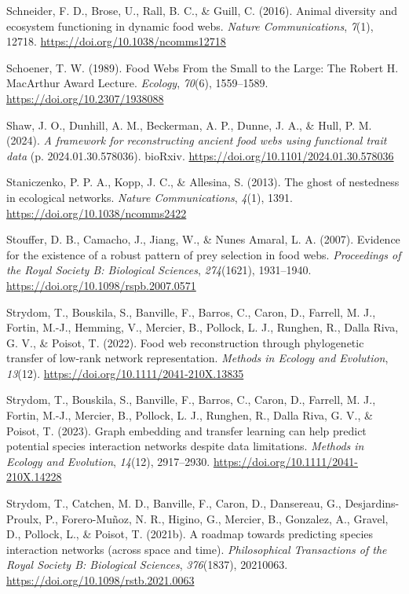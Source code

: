 \documentclass[
]{article}
\newlength{\cslhangindent}
\newenvironment{CSLReferences}[2] %
 {\begin{list}{}{%
  \setlength{\itemindent}{0pt}
  \setlength{\leftmargin}{0pt}
  \setlength{\parsep}{0pt}
  \ifodd #1
   \setlength{\leftmargin}{\cslhangindent}
   \setlength{\itemindent}{-1\cslhangindent}
  \fi
  \setlength{\itemsep}{#2\baselineskip}}}
 {\end{list}}
\begin{document}
\begin{CSLReferences}{1}{0}
Schneider, F. D., Brose, U., Rall, B. C., \& Guill, C. (2016). Animal
diversity and ecosystem functioning in dynamic food webs. \emph{Nature
Communications}, \emph{7}(1), 12718.
\url{https://doi.org/10.1038/ncomms12718}

Schoener, T. W. (1989). Food Webs From the Small to the Large: The
Robert H. MacArthur Award Lecture. \emph{Ecology}, \emph{70}(6),
1559--1589. \url{https://doi.org/10.2307/1938088}

Shaw, J. O., Dunhill, A. M., Beckerman, A. P., Dunne, J. A., \& Hull, P.
M. (2024). \emph{A framework for reconstructing ancient food webs using
functional trait data} (p. 2024.01.30.578036). bioRxiv.
\url{https://doi.org/10.1101/2024.01.30.578036}

Staniczenko, P. P. A., Kopp, J. C., \& Allesina, S. (2013). The ghost of
nestedness in ecological networks. \emph{Nature Communications},
\emph{4}(1), 1391. \url{https://doi.org/10.1038/ncomms2422}

Stouffer, D. B., Camacho, J., Jiang, W., \& Nunes Amaral, L. A. (2007).
Evidence for the existence of a robust pattern of prey selection in food
webs. \emph{Proceedings of the Royal Society B: Biological Sciences},
\emph{274}(1621), 1931--1940.
\url{https://doi.org/10.1098/rspb.2007.0571}

Strydom, T., Bouskila, S., Banville, F., Barros, C., Caron, D., Farrell,
M. J., Fortin, M.-J., Hemming, V., Mercier, B., Pollock, L. J., Runghen,
R., Dalla Riva, G. V., \& Poisot, T. (2022). Food web reconstruction
through phylogenetic transfer of low-rank network representation.
\emph{Methods in Ecology and Evolution}, \emph{13}(12).
\url{https://doi.org/10.1111/2041-210X.13835}

Strydom, T., Bouskila, S., Banville, F., Barros, C., Caron, D., Farrell,
M. J., Fortin, M.-J., Mercier, B., Pollock, L. J., Runghen, R., Dalla
Riva, G. V., \& Poisot, T. (2023). Graph embedding and transfer learning
can help predict potential species interaction networks despite data
limitations. \emph{Methods in Ecology and Evolution}, \emph{14}(12),
2917--2930. \url{https://doi.org/10.1111/2041-210X.14228}

Strydom, T., Catchen, M. D., Banville, F., Caron, D., Dansereau, G.,
Desjardins-Proulx, P., Forero-Muñoz, N. R., Higino, G., Mercier, B.,
Gonzalez, A., Gravel, D., Pollock, L., \& Poisot, T. (2021b). A roadmap
towards predicting species interaction networks (across space and time).
\emph{Philosophical Transactions of the Royal Society B: Biological
Sciences}, \emph{376}(1837), 20210063.
\url{https://doi.org/10.1098/rstb.2021.0063}


\end{CSLReferences}
\end{document}

